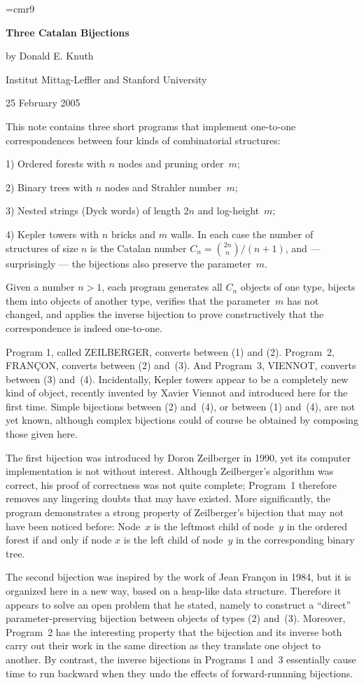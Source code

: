 \font\mc=cmr9

\centerline{\bf Three Catalan Bijections}
\bigskip
\centerline{by Donald E. Knuth}
\smallskip
\centerline{Institut Mittag-Leffler and Stanford University}
\centerline{25 February 2005}
\bigskip
\bigskip
\noindent
This note contains three short programs that implement one-to-one
correspondences between four kinds of combinatorial structures:
\smallskip\item{1)} Ordered forests with $n$ nodes and pruning order~$m$;
\smallskip\item{2)} Binary trees with $n$ nodes and Strahler number~$m$;
\smallskip\item{3)} Nested strings (Dyck words) of length $2n$ and
log-height~$m$;
\smallskip\item{4)} Kepler towers with $n$ bricks and $m$ walls.
\smallskip\noindent
In each case the number of structures of size $n$ is the Catalan
number $C_n={2n\choose n}/(n+1)$, and --- surprisingly --- the
bijections also preserve the parameter~$m$.

Given a number $n>1$, each program generates all $C_n$ objects of
one type, bijects them into objects of another type, verifies that
the parameter~$m$ has not changed, and applies the inverse bijection
to prove constructively that the correspondence is indeed one-to-one.

Program 1, called {\mc ZEILBERGER}, converts between (1) and (2).
Program~2, {\mc FRAN\c{C}ON}, converts between (2) and~(3). And
Program~3, {\mc VIENNOT}, converts between (3) and~(4). Incidentally,
Kepler towers appear to be a completely new kind of object, recently
invented by Xavier Viennot and introduced here for the first time.
Simple bijections between (2) and~(4), or between (1) and~(4),
are not yet known, although complex bijections could of course
be obtained by composing those given here.

The first bijection was introduced by Doron Zeilberger in 1990, yet
its computer implementation is not without interest. Although
Zeilberger's algorithm was correct, his proof of correctness
was not quite complete; Program~1 therefore removes any lingering doubts
that may have existed. More significantly, the program demonstrates
a strong property of Zeilberger's bijection that may not have been
noticed before: Node~$x$ is the leftmost child of node~$y$ in the
ordered forest if and only if node $x$ is the left child of
node~$y$ in the corresponding binary tree.

The second bijection was inspired by the work of Jean Fran\c{c}on
in 1984, but it is organized here in a new way, based on a heap-like
data structure. Therefore it appears to solve an open problem that
he stated, namely to construct a ``direct'' parameter-preserving
bijection between objects of types (2) and~(3). Moreover, Program~2
has the interesting property that the bijection and its inverse
both carry out their work in the same direction as they translate
one object to another. By contrast, the inverse bijections in Programs
1 and~3 essentially cause time to run backward when they undo the
effects of forward-runnning bijections.

